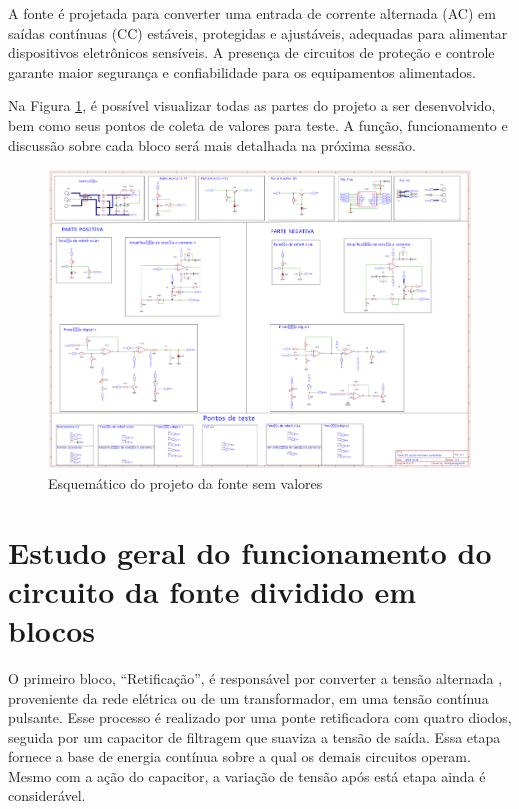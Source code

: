 \documentclass[
	12pt,				%
	oneside,			%
	a4paper,			%
	chapter=TITLE,
	sumario=tradicional,
	english,			%
	brazil				%
]{abntex2}
\begin{document}
A fonte é projetada para converter uma entrada de corrente alternada (AC) em saídas contínuas (CC) estáveis, protegidas e ajustáveis, adequadas para alimentar dispositivos eletrônicos sensíveis. A presença de circuitos de proteção e controle garante maior segurança e confiabilidade para os equipamentos alimentados.

Na Figura \ref{fig:esquematico}, é possível visualizar todas as partes do projeto a ser desenvolvido, bem como seus pontos de coleta de valores para teste. A função, funcionamento e discussão sobre cada bloco será mais detalhada na próxima sessão.


\begin{figure}[H]
    \centering
    \includegraphics[width=\linewidth]{images/Esquematico.pdf}
    \caption{Esquemático do projeto da fonte sem valores}
    \label{fig:esquematico}
\end{figure}


\chapter{Estudo geral do funcionamento do circuito da fonte dividido em blocos}\label{cap:estudo_geral} 

O primeiro bloco, ``Retificação'', é responsável por converter a tensão alternada , proveniente da rede elétrica ou de um transformador, em uma tensão contínua pulsante. Esse processo é realizado por uma ponte retificadora com quatro diodos, seguida por um capacitor de filtragem que suaviza a tensão de saída. Essa etapa fornece a base de energia contínua sobre a qual os demais circuitos operam. Mesmo com a ação do capacitor, a variação de tensão após está etapa ainda é considerável.
\end{document}
